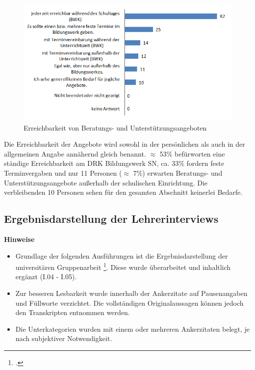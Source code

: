 \begin{figure}[ht]
	\centering
		\includegraphics[width=1.0\textwidth]{images/Erreichbarkeit-von-Beratungs-und-Unterstuetzungangeboten(2).png}
	\caption{Erreichbarkeit von Beratungs- und Unterstützungsangeboten}
	\label{fig:Erreichbarkeit-von-Beratungs-und-Unterstuetzungangeboten(2)}
\end{figure}

\noindent
Die Erreichbarkeit der Angebote wird sowohl in der persönlichen als auch in der allgemeinen Angabe annähernd gleich benannt. $\approx$ 53\% befürworten eine ständige Erreichbarkeit am DRK Bildungswerk SN, ca. 33\% fordern feste Terminvergaben und nur 11 Personen ($\approx$ 7\%) erwarten Beratungs- und Unterstützungsangebote außerhalb der schulischen Einrichtung. Die verbleibenden 10 Personen sehen für den gesamten Abschnitt keinerlei Bedarfe.

\newpage
\subsection{Ergebnisdarstellung der Lehrerinterviews}
\label{sec:ErgebnisdarstellungDerLehrerinterviews}

\textbf{Hinweise} 
\begin{itemize}
	\item Grundlage der folgenden Ausführungen ist die Ergebnisdarstellung der universitären Gruppenarbeit \footcite[vgl.]{Hemmerling2015}. Diese wurde überarbeitet und inhaltlich ergänzt (I.04 - I.05).
	 \item Zur besseren Lesbarkeit wurde innerhalb der Ankerzitate auf Pausenangaben und Füllworte verzichtet. Die vollständigen Originalaussagen können jedoch den Transkripten entnommen werden.
	\item Die Unterkategorien wurden mit einem oder mehreren Ankerzitaten belegt, je nach subjektiver Notwendigkeit.
\end{itemize}

